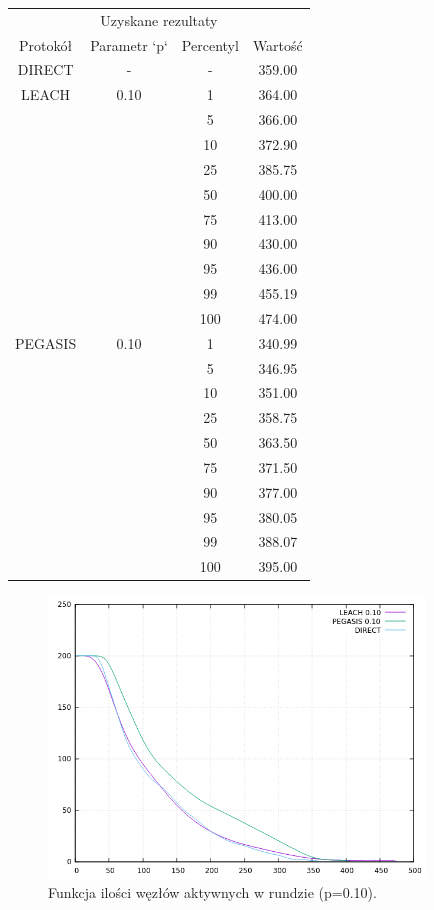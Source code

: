 \documentclass[a4paper,12pt,twoside,openany]{report}
\begin{document}
\begin{longtable}{*{4}{c}}
\toprule
\multicolumn{4}{c}{Uzyskane rezultaty} \\
Protokół	& Parametr `p`	& Percentyl	& Wartość \\
\midrule
\endhead
DIRECT	& - 	& -	& 359.00 \\*
\midrule
LEACH	& 0.10	& 1	& 364.00 \\*
	&	& 5	& 366.00 \\*
	&	& 10	& 372.90 \\*
	&	& 25	& 385.75 \\*
	&	& 50	& 400.00 \\*
	&	& 75	& 413.00 \\*
	&	& 90	& 430.00 \\*
	&	& 95	& 436.00 \\*
	&	& 99	& 455.19 \\*
	&	& 100	& 474.00 \\*
\midrule
PEGASIS	& 0.10	& 1	& 340.99 \\*
	&	& 5	& 346.95 \\*
	&	& 10	& 351.00 \\*
	&	& 25	& 358.75 \\*
	&	& 50	& 363.50 \\*
	&	& 75	& 371.50 \\*
	&	& 90	& 377.00 \\*
	&	& 95	& 380.05 \\*
	&	& 99	& 388.07 \\*
	&	& 100	& 395.00 \\*
\bottomrule
\end{longtable}

\begin{figure}[H]
 \centering
 \includegraphics[width=10cm]{images/gnuplot/test_4/nodes_in_round_p010.png}
 \caption{Funkcja ilości węzłów aktywnych w rundzie (p=0.10).}
\end{figure}
\end{document}
